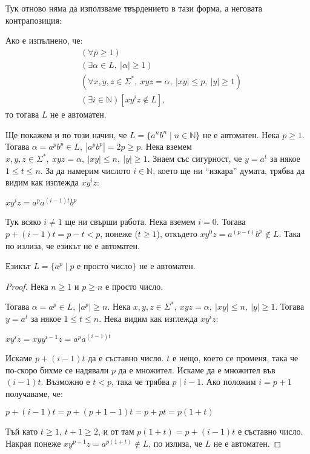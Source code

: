 Тук отново няма да използваме твърдението в тази форма, а неговата контрапозиция:

\begin{corollary}
    Ако е изпълнено, че:
    \begin{align*}
         & (\forall p \geq 1)                                                             \\
         & (\exists \alpha \in L, \: |\alpha| \geq 1)                                     \\
         & (\forall x, y, z \in \Sigma^*, \: xyz = \alpha, \: |xy| \leq p, \: |y| \geq 1) \\
         & (\exists i \in \mathbb{N}) [xy^iz \notin L],
    \end{align*}
    то тогава $L$ не е автоматен.
\end{corollary}

Ще покажем и по този начин, че $L = \{ a^nb^n \mid n \in \mathbb{N} \}$ не е автоматен.
Нека $p \geq 1$.
Тогава $\alpha = a^pb^p \in L, \: |a^pb^p| = 2p \geq p$.
Нека вземем $x, y, z \in \Sigma^*, \: xyz = \alpha, \: |xy| \leq n, \: |y| \geq 1$.
Знаем със сигурност, че $y = a^t$ за някое $1 \leq t \leq n$.
За да намерим числото $i \in \mathbb{N}$, което ще ни ``изкара'' думата, трябва да видим как изглежда $xy^iz$:
\begin{center}
    $xy^iz = a^pa^{(i - 1)t}b^p$
\end{center}
Тук всяко $i \neq 1$ ще ни свърши работа.
Нека вземем $i = 0$.
Тогава $p + (i - 1)t = p - t < p$, понеже ($t \geq 1$), откъдето $xy^0z = a^{(p - t)}b^p \notin L$.
Така по  излиза, че езикът не е автоматен.

\begin{claim}
    Езикът $L = \{ a^p \mid p \text{ е просто число} \}$ не е автоматен.
\end{claim}

\begin{proof}
    Нека $n \geq 1$ и $p \geq n$ е просто число.

    Тогава $\alpha = a^p \in L, \: |a^p| \geq n$.
    Нека $x, y, z \in \Sigma^*, \: xyz = \alpha, \: |xy| \leq n, \: |y| \geq 1$.
    Тогава $y = a^t$ за някое $1 \leq t \leq n$.
    Нека видим как изглежда $xy^iz$:
    \begin{center}
        $xy^iz = xyy^{i - 1}z = a^pa^{(i - 1)t}$
    \end{center}
    Искаме $p + (i - 1)t$ да е съставно число.
    $t$ е нещо, което се променя, така че по-скоро бихме се надявали $p$ да е множител.
    Искаме да е множител във $(i - 1)t$. Възможно е $t < p$, така че трябва $p \mid i - 1$.
    Ако положим $i = p + 1$ получаваме, че:
    \begin{center}
        $p + (i - 1)t = p + (p + 1 - 1)t = p + pt = p(1 + t)$
    \end{center}
    Тъй като $t \geq 1, \: t + 1 \geq 2$, и от там $p(1 + t) = p + (i - 1)t$ е съставно число.
    Накрая понеже $xy^{p + 1}z = a^{p(1 + t)} \notin L$, по  излиза, че $L$ не е автоматен.
\end{proof}


